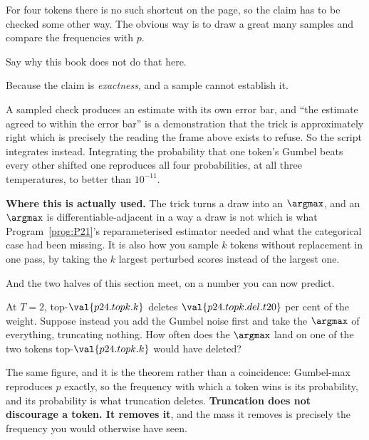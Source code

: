 \begin{fr}
For four tokens there is no such shortcut on the page, so the claim has to be
checked some other way. The obvious way is to draw a great many samples and
compare the frequencies with $p$.

Say why this book does not do that here.
\dotline
\nextframe
\end{fr}

\begin{fr}
\begin{ansblock}
Because the claim is \emph{exactness}, and a sample cannot establish it.
\end{ansblock}

A sampled check produces an estimate with its own error bar, and
\enquote{the estimate agreed to within the error bar} is a demonstration that
the trick is approximately right \dash{} which is precisely the reading the
frame above exists to refuse. So the script integrates instead. Integrating the probability that one token's
Gumbel beats every other shifted one reproduces all four probabilities, at all
three temperatures, to better than $10^{-11}$.

\begin{aibox}
\textbf{Where this is actually used.} The trick turns a draw into an
$\argmax$, and an $\argmax$ is differentiable-adjacent in a way a draw is not
\dash{} which is what Program~\ref{prog:P21}'s reparameterised estimator
needed and what the categorical case had been missing. It is also how you
sample $k$ tokens without replacement in one pass, by taking the $k$ largest
perturbed scores instead of the largest one.
\end{aibox}
\end{fr}

\begin{fr}
And the two halves of this section meet, on a number you can now predict.

At $T = 2$, top-$\val{p24.topk.k}$ deletes $\val{p24.topk.del.t20}$ per cent
of the weight. Suppose instead you add the Gumbel noise first and take the
$\argmax$ of everything, truncating nothing. How often does the $\argmax$
land on one of the two tokens top-$\val{p24.topk.k}$ would have deleted?
\dotline
\nextframe
\end{fr}

\begin{fr}

The same figure, and it is the theorem rather than a coincidence: Gumbel-max
reproduces $p$ exactly, so the frequency with which a token wins is its
probability, and its probability is what truncation deletes. \textbf{Truncation
does not discourage a token. It removes it}, and the mass it removes is
precisely the frequency you would otherwise have seen.
\end{fr}

